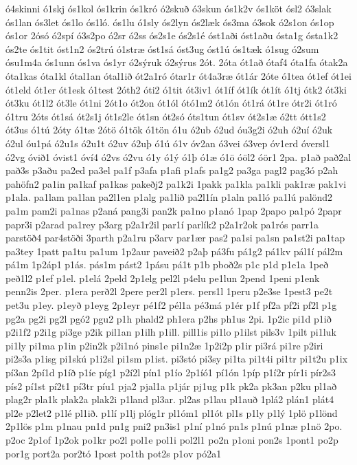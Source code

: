 {ó4skinni
ó1skj
ós1kol
ós1krin
ós1kró
ó2skuð
ó3skun
ós1k2v
ós1köt
ósl2
ó3slak
ós1lan
ós3let
ós1lo
ós1ló.
ós1lu
ó1sly
ós2lyn
ós2læk
ós3ma
ó3sok
ó2s1on
ós1op
ós1or
2ósó
ó2spí
ó3s2po
ó2sr
ó2ss
ós2s1e
ós2s1é
óst1aði
óst1aðu
ósta1g
ósta1k2
ós2te
ós1tit
óst1n2
ós2trú
ó1stræ
óst1sá
óst3ug
óst1ú
ós1tæk
ó1sug
ó2sum
ósu1m4a
ós1unn
ós1va
ós1yr
ó2sýruk
ó2sýrus
2ót.
2óta
ót1að
ótaf4
óta1fa
ótak2a
óta1kas
óta1kl
ótal1an
ótal1ið
ót2a1ró
ótar1r
ót4a3ræ
ót1ár
2óte
ó1tea
ót1ef
ót1ei
ót1eld
ót1er
ót1esk
ó1test
2óth2
óti2
ó1tit
ót3iv1
ót1íf
ót1ík
ót1ít
ó1tj
ótk2
ót3ki
ót3ku
ót1l2
ót3le
ót1ni
2ót1o
ót2on
ót1ól
ótó1m2
ót1ón
ót1rá
ót1re
ótr2i
ót1ró
ó1tru
2óts
ót1sá
ót2s1j
ót1s2le
ót1sn
ót2só
óts1tun
ót1sv
ót2s1æ
ó2tt
ótt1s2
ót3us
ó1tú
2óty
ó1tæ
2ótö
ó1tök
ó1tön
ó1u
ó2ub
ó2ud
óu3g2i
ó2uh
ó2uí
ó2uk
ó2ul
óu1pá
ó2u1s
ó2u1t
ó2uv
ó2uþ
ó1ú
ó1v
óv2an
ó3vei
ó3vep
óv1erd
óversl1
ó2vg
óvið1
óvist1
óví4
ó2vs
ó2vu
ó1y
ó1ý
ó1þ
ó1æ
ó1ö
óöl2
óör1
2pa.
p1að
pað2al
pað3s
p3aðu
pa2ed
pa3el
pa1f
p3afa
p1afi
p1afs
pa1g2
pa3ga
pagl2
pag3ó
p2ah
pahöfn2
pa1in
pa1kaf
pa1kas
pakeðj2
pa1k2i
1pakk
pa1kla
pa1kli
pak1ræ
pak1vi
p1ala.
pa1lam
pa1lan
pa2l1en
p1alg
pa1lið
pa2l1ín
p1aln
pa1ló
pa1lú
palönd2
pa1m
pam2i
pa1nas
p2aná
pang3i
pan2k
pa1no
p1anó
1pap
2papo
pa1pó
2papr
papr3i
p2arad
pa1rey
p3arg
p2a1r2il
par1í
parlík2
p2a1r2ok
pa1rós
parr1a
parstöð4
par4stöði
3parth
p2a1ru
p3arv
par1ær
pas2
pa1si
pa1sn
pa1st2i
pa1tap
pa3tey
1patt
pa1tu
pa1um
1p2aur
paveið2
p2aþ
pá3fu
pá1g2
pá1kv
pál1í
pál2m
pá1m
1p2áp1
p1ás.
pás1m
pást2
1pásu
pá1t
p1b
pboð2s
p1c
p1d
p1e1a
1peð
peð1l2
p1ef
p1el.
p1elá
2peld
2p1elg
pel2l
p4elu
pe1lun
2pend
1peni
p1enk
penn2is
2per.
p1era
perð2l
2pere
per2l
p1ers.
pers1l
1peru
p2e3se
1pest3
pe2t
pet3u
p1ey.
p1eyð
p1eyg
2p1eyr
pé1f2
pél1a
pé3má
p1ér
p1f
pf2a
pf2i
pf2l
p1g
pg2a
pg2i
pg2l
pgó2
pgu2
p1h
phald2
ph1era
p2hs
ph1us
2pi.
1p2ic
pi1d
p1ið
p2i1f2
p2i1g
pi3ge
p2ik
pil1an
p1ilh
p1ill.
pill1is
pi1lo
p1ilst
pils3v
1pilt
pi1luk
pi1ly
pi1ma
p1in
p2in2k
p2i1nó
pins1e
pi1n2æ
1p2i2p
p1ir
pi3rá
pi1re
p2iri
pi2s3a
p1isg
pi1skú
p1i2sl
pi1sm
p1ist.
pi3stó
pi3sy
pi1ta
pi1t4i
pi1tr
pi1t2u
p1ix
pí3an
2pí1d
p1íð
p1íe
píg1
p2í2l
pín1
p1ío
2p1íó1
pí1ón
1píp
p1í2r
pír1i
pír2s3
pís2
pí1st
pí2t1
pí3tr
píu1
pja2
pjal1a
p1jár
pj1ug
p1k
pk2a
pk3an
p2ku
pl1að
plag2r
pla1k
plak2a
plak2i
p1land
pl3ar.
pl2as
p1lau
pl1auð
1plá2
plán1
plát4
pl2e
p2let2
p1lé
pl1ið.
p1lí
p1lj
plóg1r
pl1óm1
pl1ót
pl1s
p1ly
p1lý
1plö
p1lönd
2p1lös
p1m
p1nau
pn1d
pn1g
pni2
pn3is1
p1ní
p1nó
pn1s
p1nú
p1næ
p1nö
2po.
p2oc
2p1of
1p2ok
po1kr
po2l
pol1e
pol1i
pol2l1
po2n
p1oni
pon2s
1pont1
po2p
por1g
port2a
por2tó
1post
po1th
pot2s
p1ov
pó2a1
}
